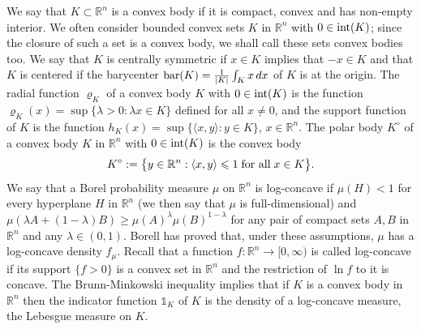 \documentclass[11pt,leqno]{article}
\theoremstyle{definition}
\theoremstyle{remark}
\numberwithin{equation}{section}
\newcommand{\ls}{\leqslant}
\newcommand{\gr}{\geqslant}
\newcommand{\1}{\textbf{1}}
\begin{document}
We say that $K\subset {\mathbb R}^n$ is a convex body if it is compact, convex and has non-empty interior. We often consider bounded convex sets $K$ in ${\mathbb R}^n$ with $0\in {\rm int}(K)$; since the closure of such a set
is a convex body, we shall call these sets convex bodies too. We say that $K$ is centrally symmetric if $x\in K$ implies
that $-x\in K$ and that $K$ is centered if the barycenter ${\rm bar}(K)=\frac{1}{|K|}\int_Kx\,dx$ of $K$ is at the origin.
The radial function $\varrho_K$ of a convex body $K$ with $0\in {\rm int}(K)$ is the function
$\varrho_K(x)=\sup \{\lambda >0:\lambda x\in K\}$ defined for all $x\neq 0$, and
the support function of $K$ is the function $h_K(x) = \sup\{\langle x,y\rangle :y\in K\}$, $x\in {\mathbb R}^n$.
The polar body $K^{\circ }$ of a convex body $K$ in ${\mathbb R}^n$ with $0\in {\rm int}(K)$ is the convex body
\begin{equation*}
K^{\circ}:=\bigl\{y\in {\mathbb R}^n: \langle x,y\rangle \ls 1\;\hbox{for all}\; x\in K\bigr\}.
\end{equation*}
We say that a Borel probability measure $\mu$ on $\mathbb R^n$ is log-concave if $\mu(H)<1$ for every hyperplane $H$ in ${\mathbb R}^n$
(we then say that $\mu$ is full-dimensional) and $\mu(\lambda A+(1-\lambda)B) \gr \mu(A)^{\lambda}\mu(B)^{1-\lambda}$ for any pair of compact sets $A,B$ in ${\mathbb R}^n$
and any $\lambda \in (0,1)$. Borell \cite{Borell-1974} has proved that, under these assumptions, $\mu $ has a log-concave density $f_{{\mu }}$. Recall that a function $f:\mathbb R^n \rightarrow [0,\infty)$ is called log-concave if its support $\{f>0\}$ is a convex set in ${\mathbb R}^n$ and the restriction of $\ln{f}$ to it is concave. The Brunn-Minkowski inequality implies that if $K$ is a convex body in $\mathbb R^n$ then the indicator function $\mathds{1}_{K} $ of $K$ is the density of a log-concave measure, the Lebesgue measure on $K$.
\end{document}
